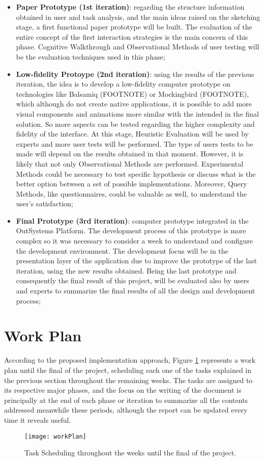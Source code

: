 \begin{itemize}
    \begin{itemize}
        \item \textbf{Paper Prototype (1st iteration)}: regarding the structure information obtained in user and task analysis, and the main ideas raised on the sketching stage, a first functional paper prototype will be built. The evaluation of the entire concept of the first interaction strategies is the main concern of this phase. Cognitive Walkthrough and Observational Methods of user testing will be the evaluation techniques used in this phase;
        \item \textbf{Low-fidelity Protoype (2nd iteration)}: using the results of the previous iteration, the idea is to develop a low-fidelity computer prototype on technologies like Balsamiq (FOOTNOTE) or Mockingbird (FOOTNOTE), which although do not create native applications, it is possible to add more visual components and animations more similar with the intended in the final solution. So more aspects can be tested regarding the higher complexity and fidelity of the interface. At this stage, Heuristic Evaluation will be used by experts and more user tests will be performed. The type of users tests to be made will depend on the results obtained in that moment. However, it is likely that not only Observational Methods are performed. Experimental Methods could be necessary to test specific hypothesis or discuss what is the better option between a set of possible implementations. Moreover, Query Methods, like questionnaires, could be valuable as well, to understand the user’s satisfaction;
        \item \textbf{Final Prototype (3rd iteration)}: computer prototype integrated in the OutSystems Platform. The development process of this prototype is more complex so it was necessary to consider a week to understand and configure the development environment. The development focus will be in the presentation layer of the application due to improve the prototype of the last iteration, using the new results obtained. Being the last prototype and consequently the final result of this project, will be evaluated also by users and experts to summarize the final results of all the design and development process;

    \end{itemize}

\end{itemize}

\section{Work Plan}
\label{sec:work_plan}
According to the proposed implementation approach, Figure \ref{fig:work_plan} represents a work plan until the final of the project, scheduling each one of the tasks explained in the previous section throughout the remaining weeks. The tasks are assigned to its respective major phases, and the focus on the writing of the document is principally at the end of each phase or iteration to summarize all the contents addressed meanwhile these periods, although the report can be updated every time it reveals useful.

\begin{figure}[htbp]
	\centering
	\texttt{[image: workPlan]}
	\caption{Task Scheduling throughout the weeks until the final of the project.}
	\label{fig:work_plan}
\end{figure}




